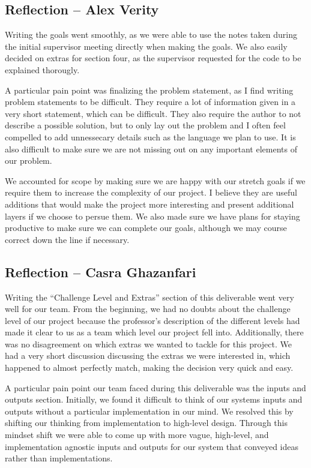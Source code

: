 \documentclass{article}
\begin{document}
\subsection*{Reflection -- Alex Verity}

Writing the goals went smoothly, as we were able to use the notes taken during
the initial supervisor meeting directly when making the goals. We also easily
decided on extras for section four, as the supervisor requested for the code
to be explained thorougly.\newline

A particular pain point was finalizing the problem statement, as I find
writing problem statements to be difficult. They require a lot of information
given in a very short statement, which can be difficult. They also require
the author to not describe a possible solution, but to only lay out the
problem and I often feel compelled to add unnessecary details such as the
language we plan to use. It is also difficult to make sure we are not missing
out on any important elements of our problem.\newline

We accounted for scope by making sure we are happy with our stretch goals if
we require them to increase the complexity of our project. I believe they are
useful additions that would make the project more interesting and present
additional layers if we choose to persue them. We also made sure we have plans
for staying productive to make sure we can complete our goals, although we may
course correct down the line if necessary.

\subsection*{Reflection -- Casra Ghazanfari}

Writing the “Challenge Level and Extras” section of this deliverable went
very well for our team. From the beginning, we had no doubts about the challenge
level of our project because the professor’s description of the different levels
had made it clear to us as a team which level our project fell into.
Additionally, there was no disagreement on which extras we wanted to tackle for
this project. We had a very short discussion discussing the extras we were
interested in, which happened to almost perfectly match, making the decision
very quick and easy. \newline

A particular pain point our team faced during this deliverable was the inputs
and outputs section. Initially, we found it difficult to think of our systems
inputs and outputs without a particular implementation in our mind. We resolved
this by shifting our thinking from implementation to high-level design. Through
this mindset shift we were able to come up with more vague, high-level, and
implementation agnostic inputs and outputs for our system that conveyed ideas
rather than implementations. \newline
\end{document}

